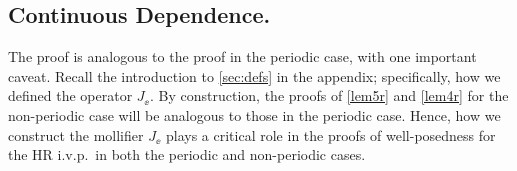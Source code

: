 \subsection{Continuous Dependence.} The proof is analogous to the proof in
the periodic case, with one important caveat. Recall the introduction to \cref{sec:defs} in the appendix; specifically, how we defined the operator
$J_\ee$. By construction, the proofs of \cref{lem5r} and \cref{lem4r} for the non-periodic case will be
analogous to those in the periodic case. Hence, how we
construct the mollifier $J_\ee$ plays a critical role in the proofs of
well-posedness for the HR i.v.p.\ in both the periodic and non-periodic cases. %
%
%
%
%
%
%
%
%
%
%
